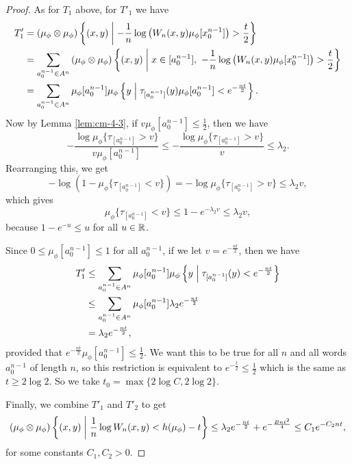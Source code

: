 \begin{theorem}
\begin{proof}
		As for $T_1$ above, for $T'_1$ we have
		\begin{align*}
			T'_1 &= (\mu_\phi \otimes \mu_\phi)\left\{(x, y) \midmid -\frac{1}{n}\log\left(W_n(x, y) \mu_\phi[x_0^{n - 1}]\right) > \frac{t}{2}\right\} \\
				&= \sum_{a_0^{n - 1} \in A^n}{(\mu_\phi \otimes \mu_\phi)\left\{(x, y) \midmid x \in [a_0^{n - 1}],\ -\frac{1}{n}\log\left(W_n(x, y) \mu_\phi[x_0^{n - 1}]\right) > \frac{t}{2}\right\}} \\
				&= \sum_{a_0^{n - 1} \in A^n} \mu_\phi[a_0^{n - 1}]\mu_\phi\left\{y \midmid \tau_{[a_0^{n - 1}]}(y) \mu_\phi[a_0^{n - 1}] < e^{-\frac{nt}{2}}\right\}.
		\end{align*}
		Now by Lemma \ref{lem:cm-4-3}, if $v\mu_\phi[a_0^{n - 1}] \leq \frac{1}{2}$, then we have
		\[
			-\frac{\log{\mu_\phi\{\tau_{[a_0^{n - 1}]} > v\}}}{v\mu_\phi[a_0^{n - 1}]} \leq -\frac{\log{\mu_\phi\{\tau_{[a_0^{n - 1}]} > v\}}}{v} \leq \lambda_2.
		\]
		Rearranging this, we get
		\[
			-\log\left(1 - \mu_\phi\{\tau_{[a_0^{n - 1}]} < v\}\right) = -\log{\mu_\phi\{\tau_{[a_0^{n - 1}]} > v\}} \leq \lambda_2 v,
		\]
		which gives
		\[
			\mu_\phi\{\tau_{[a_0^{n - 1}]} < v\} \leq 1 - e^{-\lambda_2 v} \leq \lambda_2 v,
		\]
		because $1 - e^{-u} \leq u$ for all $u \in \mathbb{R}$.
		
		Since $0 \leq \mu_\phi[a_0^{n - 1}] \leq 1$ for all $a_0^{n - 1}$, if we let $v = e^{-\frac{nt}{2}}$, then we have
		\begin{align*}
			T'_1 &\leq \sum_{a_0^{n - 1} \in A^n} \mu_\phi[a_0^{n - 1}]\mu_\phi\left\{y \mathrel{}\middle|\mathrel{} \tau_{[a_0^{n - 1}]}(y) < e^{-\frac{nt}{2}}\right\} \\
				&\leq \sum_{a_0^{n - 1} \in A^n} \mu_\phi[a_0^{n - 1}] \lambda_2 e^{-\frac{nt}{2}} \\
				&= \lambda_2 e^{-\frac{nt}{2}},
		\end{align*}
		provided that $e^{-\frac{nt}{2}}\mu_\phi[a_0^{n - 1}] \leq \frac{1}{2}$. We want this to be true for all $n$ and all words $a_0^{n - 1}$ of length $n$, so this restriction is equivalent to $e^{-\frac{t}{2}} \leq \frac{1}{2}$ which is the same as $t \geq 2\log{2}$. So we take $t_0 = \max\{2\log{C}, 2 \log{2}\}$.
		
		Finally, we combine $T'_1$ and $T'_2$ to get
		\[
			(\mu_\phi \otimes \mu_\phi)\left\{(x, y) \mathrel{}\middle|\mathrel{} \frac{1}{n}\log{W_n(x, y)} < h(\mu_\phi) - t\right\} \leq \lambda_2 e^{-\frac{nt}{2}} + e^{-\frac{Bnt^2}{4}} \leq C_1e^{-C_2 nt},
		\]
		for some constants $C_1, C_2 > 0$.
	\end{proof}
\end{theorem}
